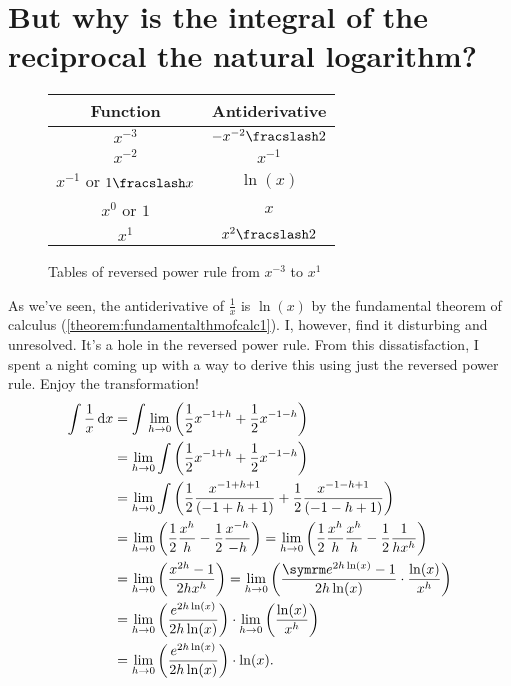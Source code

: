 \section{But why is the integral of the reciprocal the natural logarithm?}
\label{sec:integralofthereciprocal}

\begin{wrapfigure}{r}{0.45\textwidth}
    \centering
    \begin{tabular}{c | c}
        Function & Antiderivative \\
        \hline
        $x^{-3}$ & $-\flatfrac{x^{-2}}{2}$ \\
        $x^{-2}$ & $x^{-1}$ \\
        $x^{-1}$ or $\flatfrac{1}{x}$ & $\ln(x)$ \\
        $x^{0}$ or $1$ & $x$ \\
        $x^1$ & $\flatfrac{x^2}{2}$ \\
    \end{tabular}
    \caption{Tables of reversed power rule from $x^{-3}$ to $x^1$}
\end{wrapfigure}
As we've seen, the antiderivative of $\frac{1}{x}$ is $\ln(x)$ by the fundamental theorem of calculus (\cref{theorem:fundamentalthmofcalc1}). I, however, find it disturbing and unresolved. It's a hole in the reversed power rule. From this dissatisfaction, I spent a night coming up with a way to derive this using just the reversed power rule. Enjoy the transformation!
\begin{align}
    \int \frac{1}{x}\odif{x} &= \int\lim_{h \appr 0}\left(\frac{1}{2}x^{-1 + h} + \frac{1}{2}x^{-1 - h}\right) \nonumber\\
    &= \lim_{h \appr 0}\int\left(\frac{1}{2}x^{-1 + h} + \frac{1}{2}x^{-1 - h}\right) \nonumber\\
    &= \lim_{h \appr 0}\int\left(\frac{1}{2}\frac{x^{-1 + h + 1}}{(-1 + h + 1)} + \frac{1}{2}\frac{x^{-1 - h + 1}}{(-1 - h + 1)}\right) \nonumber\\
    &= \lim_{h \appr 0}\left(\frac{1}{2}\frac{x^h}{h} - \frac{1}{2}\frac{x^{-h}}{-h}\right) = \lim_{h \appr 0}\left(\frac{1}{2}\frac{x^h}{h}\frac{x^h}{h} - \frac{1}{2}\frac{1}{hx^h}\right) \nonumber\\
    &= \lim_{h \appr 0}\left(\frac{x^{2h} - 1}{2hx^h}\right) = \lim_{h \appr 0}\left(\frac{\e^{2h\ln(x)} - 1}{2h\ln(x)}\cdot\frac{\ln(x)}{x^h}\right) \nonumber\\
    &= \lim_{h \appr 0}\left(\frac{e^{2h\ln(x)}}{2h\ln(x)}\right) \cdot \lim_{h \appr 0}\left(\frac{\ln(x)}{x^h}\right) \nonumber\\
    &= \lim_{h \appr 0}\left(\frac{e^{2h\ln(x)}}{2h\ln(x)}\right) \cdot \ln(x). \label{eq:logarithmsprove1}
\end{align}

